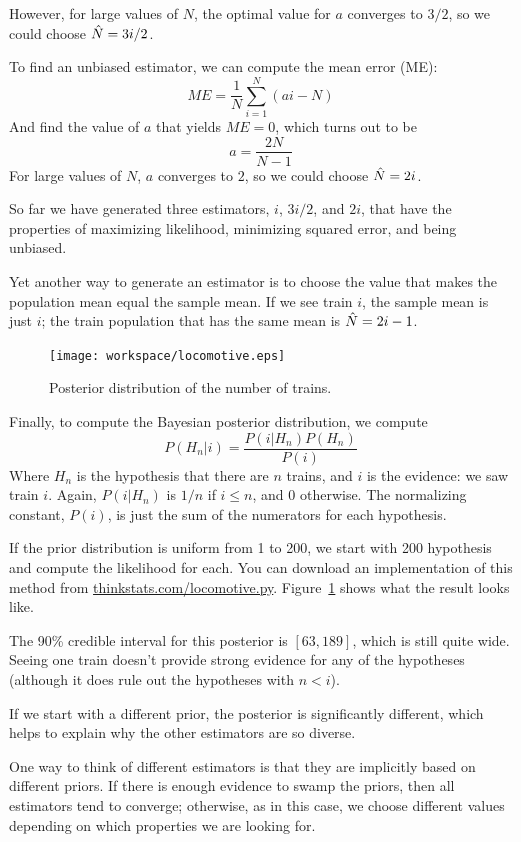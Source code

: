 \documentclass[12pt]{book}
\begin{document}
However, for large values of $N$, the optimal value for $a$ converges
to $3/2$, so we could choose $\hat{N} = 3i / 2$.

To find an unbiased estimator, we can compute the mean error (ME):
%
\[ ME = \frac{1}{N} \sum_{i=1}^N (ai - N) \]
%
And find the value of $a$ that yields $ME = 0$, which turns out to be
%
\[ a = \frac{2N}{N-1}\]
%
For large values of $N$, $a$ converges to $2$, so we could choose
$\hat{N} = 2i$.

So far we have generated three estimators, $i$, $3i/2$, and $2i$,
that have the properties of maximizing likelihood, minimizing squared
error, and being unbiased.

Yet another way to generate an estimator is to choose the value
that makes the population mean equal the sample mean.  If we see train
$i$, the sample mean is just $i$; the train population that has the
same mean is $\hat{N} = 2i - 1$.

\begin{figure}
\centerline{\texttt{[image: workspace/locomotive.eps]}}
\caption{Posterior distribution of the number of trains.}
\label{locomotive}
\end{figure}

Finally, to compute the Bayesian posterior distribution, we compute
%
\[ P(H_n|i) = \frac{P(i|H_n) P(H_n)}{P(i)} \]
%
Where $H_n$ is the hypothesis that there are $n$ trains, and $i$ is
the evidence: we saw train $i$.  Again, $P(i|H_n)$
is $1/n$ if $i \le n$, and 0 otherwise.  The normalizing constant,
$P(i)$, is just the sum of the numerators for each hypothesis.

If the prior distribution is uniform from 1 to 200, we start with 200
hypothesis and compute the likelihood for each.  You can download an
implementation of this method from
\url{thinkstats.com/locomotive.py}.  Figure~\ref{locomotive} shows
what the result looks like.

The 90\% credible interval for this posterior is $[63, 189]$, which
is still quite wide.  Seeing one train doesn't provide strong evidence
for any of the hypotheses (although it does rule out the hypotheses
with $n < i$).

If we start with a different prior, the posterior is significantly
different, which helps to explain why the other estimators are so
diverse.

One way to think of different estimators is that they are implicitly
based on different priors.  If there is enough evidence to swamp
the priors, then all estimators tend to converge; otherwise, as
in this case, we choose different values depending on which properties
we are looking for.
\end{document}
